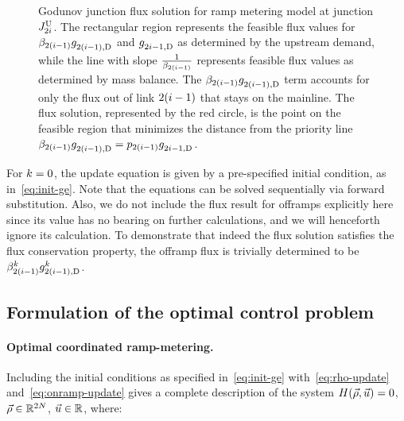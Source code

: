 \begin{figure}
								\caption{Godunov junction flux solution for ramp metering model at junction
									$J_{2i}^{\text{U}}$. The rectangular region represents the feasible flux
									values for $\splitratio_{2\left(\link-1\right)}\fout{2\left(\link-1\right)}{}$
									and $g_{2i-1,\text{D}}^{}$ as determined by the upstream demand, while
									the line with slope\label{fig:Godunov-junction-flux} $\frac{1}{\splitratio_{2\left(\link-1\right)}}$
									represents feasible flux values as determined by mass balance. The
									$\splitratio_{2\left(\link-1\right)}\fout{2\left(\link-1\right)}{}$
									term accounts for only the flux out of link $2\left(\link-1\right)$
									that stays on the mainline. The flux solution, represented by the
									red circle, is the point on the feasible region that minimizes the
									distance from the priority line $\splitratio_{2\left(\link-1\right)}\fout{2\left(\link-1\right)}{}=p_{2(\link-1)}\fout{2\link-1}{}$.}
							\end{figure}
														
														
							For $k=0$, the update equation is given by a pre-specified initial
							condition, as in~\eqref{eq:init-ge}. Note that the equations can
							be solved sequentially via forward substitution. Also, we do not include
							the flux result for offramps explicitly here since its value has no
							bearing on further calculations, and we will henceforth ignore its
							calculation. To demonstrate that indeed the flux solution satisfies
							the flux conservation property, the offramp flux is trivially determined
							to be $\splitratio_{2\left(\link-1\right)}^{\tind}\fout{2\left(\link-1\right)}{\tind}$.
														
														
							\subsection{Formulation of the optimal control problem}
														
														
							\paragraph{Optimal coordinated ramp-metering.}
														
							Including the initial conditions as specified in~\eqref{eq:init-ge}
							with~\eqref{eq:rho-update} and~\eqref{eq:onramp-update} gives
							a complete description of the system $\sys\left(\state,\control\right)=0$,
							$\vec{\rho}\in\mathbb{R}^{2N}$, $\vec{u}\in\mathbb{R}$, where:
														
